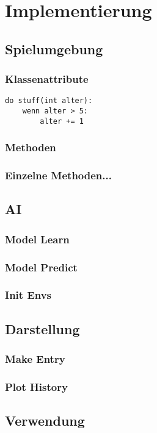 \section{Implementierung}
\subsection{Spielumgebung}
\subsubsection{Klassenattribute}
\begin{lstlisting}
do stuff(int alter):
	wenn alter > 5:
		alter += 1
\end{lstlisting}

\subsubsection{Methoden}
\subsubsection{Einzelne Methoden...}
\subsection{AI}
\subsubsection{Model Learn}
\subsubsection{Model Predict}
\subsubsection{Init Envs}
\subsection{Darstellung}
\subsubsection{Make Entry}
\subsubsection{Plot History}
\subsection{Verwendung}